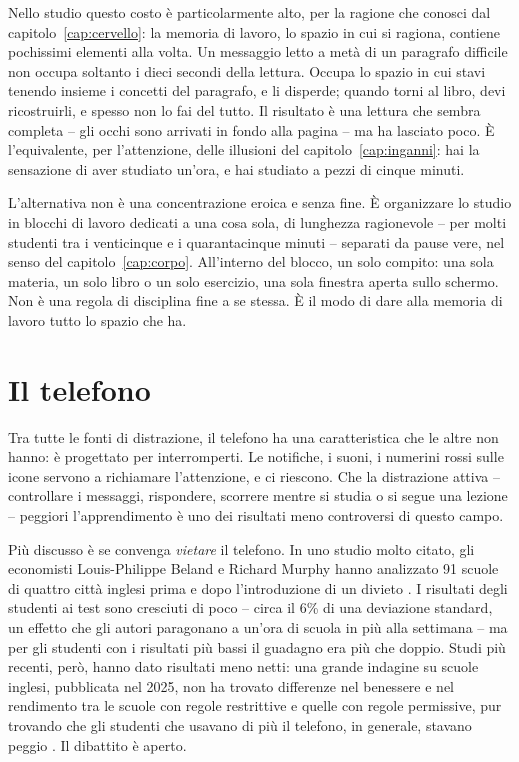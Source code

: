 Nello studio questo costo è particolarmente alto, per la ragione che
conosci dal capitolo~\ref{cap:cervello}: la memoria di lavoro, lo
spazio in cui si ragiona, contiene pochissimi elementi alla volta. Un
messaggio letto a metà di un paragrafo difficile non occupa soltanto i
dieci secondi della lettura. Occupa lo spazio in cui stavi tenendo
insieme i concetti del paragrafo, e li disperde; quando torni al libro,
devi ricostruirli, e spesso non lo fai del tutto. Il risultato è una
lettura che sembra completa -- gli occhi sono arrivati in fondo alla
pagina -- ma ha lasciato poco. È l'equivalente, per l'attenzione, delle
illusioni del capitolo~\ref{cap:inganni}: hai la sensazione di aver
studiato un'ora, e hai studiato a pezzi di cinque minuti.

L'alternativa non è una concentrazione eroica e senza fine. È
organizzare lo studio in blocchi di lavoro dedicati a una cosa sola,
di lunghezza ragionevole -- per molti studenti tra i venticinque e i
quarantacinque minuti -- separati da pause vere, nel senso del
capitolo~\ref{cap:corpo}. All'interno del blocco, un solo compito: una
sola materia, un solo libro o un solo esercizio, una sola finestra
aperta sullo schermo. Non è una regola di disciplina fine a se stessa.
È il modo di dare alla memoria di lavoro tutto lo spazio che ha.

\section{Il telefono}

Tra tutte le fonti di distrazione, il telefono ha una caratteristica
che le altre non hanno: è progettato per interromperti. Le notifiche, i
suoni, i numerini rossi sulle icone servono a richiamare l'attenzione,
e ci riescono. Che la distrazione attiva -- controllare i messaggi,
rispondere, scorrere mentre si studia o si segue una lezione -- peggiori
l'apprendimento è uno dei risultati meno controversi di questo campo.

Più discusso è se convenga \emph{vietare} il telefono. In uno studio
molto citato, gli economisti Louis-Philippe Beland e Richard Murphy
hanno analizzato 91 scuole di quattro città inglesi prima e dopo
l'introduzione di un divieto \parencite{beland2016}. I risultati degli
studenti ai test sono cresciuti di poco -- circa il 6\% di una
deviazione standard, un effetto che gli autori paragonano a un'ora di
scuola in più alla settimana -- ma per gli studenti con i risultati più
bassi il guadagno era più che doppio. Studi più recenti, però, hanno
dato risultati meno netti: una grande indagine su scuole inglesi,
pubblicata nel 2025, non ha trovato differenze nel benessere e nel
rendimento tra le scuole con regole restrittive e quelle con regole
permissive, pur trovando che gli studenti che usavano di più il
telefono, in generale, stavano peggio \parencite{goodyear2025}. Il
dibattito è aperto.

